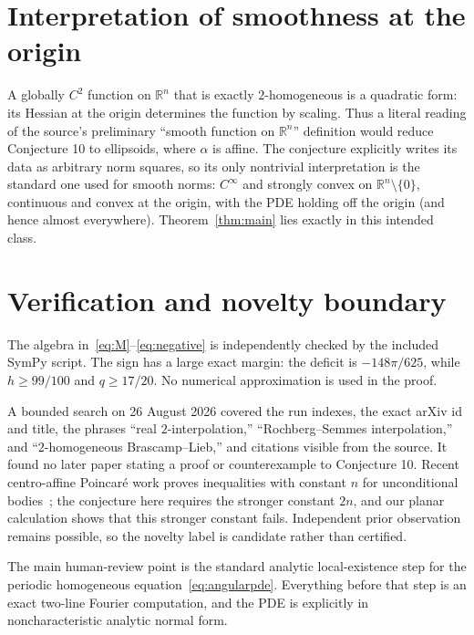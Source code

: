 \documentclass[11pt]{article}
\newcommand{\R}{\mathbb R}
\begin{document}
\section{Interpretation of smoothness at the origin}

A globally $C^2$ function on $\R^n$ that is exactly $2$-homogeneous is a
quadratic form: its Hessian at the origin determines the function by scaling.
Thus a literal reading of the source's preliminary ``smooth function on
$\R^n$'' definition would reduce Conjecture 10 to ellipsoids, where $\alpha$
is affine.  The conjecture explicitly writes its data as arbitrary norm
squares, so its only nontrivial interpretation is the standard one used for
smooth norms: $C^\infty$ and strongly convex on $\R^n\setminus\{0\}$,
continuous and convex at the origin, with the PDE holding off the origin (and
hence almost everywhere).  Theorem~\ref{thm:main} lies exactly in this
intended class.

\section{Verification and novelty boundary}

The algebra in~\eqref{eq:M}--\eqref{eq:negative} is independently checked by
the included SymPy script.  The sign has a large exact margin: the deficit is
$-148\pi/625$, while $h\geq99/100$ and $q\geq17/20$.  No numerical
approximation is used in the proof.

A bounded search on 26 August 2026 covered the run indexes, the exact arXiv id
and title, the phrases ``real $2$-interpolation,'' ``Rochberg--Semmes
interpolation,'' and ``$2$-homogeneous Brascamp--Lieb,'' and citations visible
from the source.  It found no later paper stating a proof or counterexample to
Conjecture 10.  Recent centro-affine Poincar\'e work proves inequalities with
constant $n$ for unconditional bodies~\cite{HuIvaki}; the conjecture here
requires the stronger constant $2n$, and our planar calculation shows that
this stronger constant fails.  Independent prior observation remains
possible, so the novelty label is candidate rather than certified.

The main human-review point is the standard analytic local-existence step for
the periodic homogeneous equation~\eqref{eq:angularpde}.  Everything before
that step is an exact two-line Fourier computation, and the PDE is explicitly
in noncharacteristic analytic normal form.
\end{document}
